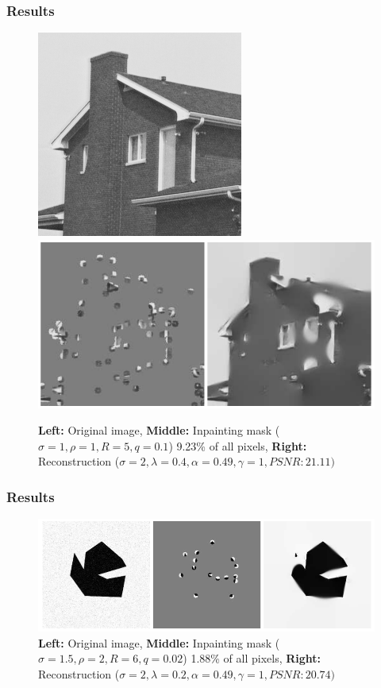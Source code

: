 \documentclass{beamer}
\begin{document}
    \begin{frame}
        \frametitle{Results}
        \begin{figure}[htpb]
            \centering
            \includegraphics[width=0.3\linewidth]{../images/grey/house.png}
            \includegraphics[width=0.6\linewidth]{images/house.png}
            \caption{ \textbf{Left:} Original image, \textbf{Middle:} Inpainting mask ($\sigma=1,
            \rho=1, R=5, q=0.1$) 9.23\% of all pixels, \textbf{Right:} Reconstruction
            ($\sigma=2,\lambda=0.4,\alpha=0.49,\gamma=1, PSNR: 21.11)$} 
        \end{figure}
    \end{frame}


    \begin{frame}
        \frametitle{Results}
        \begin{figure}[htpb]
            \centering
            \includegraphics[width=\linewidth]{images/less_noise.png}
            \caption{ \textbf{Left:} Original image, \textbf{Middle:} Inpainting mask ($\sigma=1.5,
            \rho=2, R=6, q=0.02$) 1.88\% of all pixels, \textbf{Right:} Reconstruction
            ($\sigma=2,\lambda=0.2,\alpha=0.49,\gamma=1, PSNR: 20.74)$} 
        \end{figure}
    \end{frame}
\end{document}
